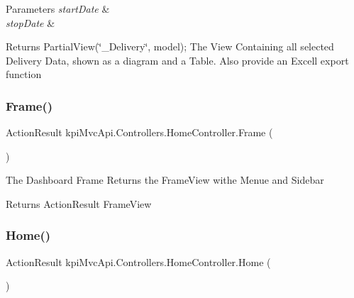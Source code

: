 \begin{DoxyParams}{Parameters}
{\em start\+Date} & \\
\hline
{\em stop\+Date} & \\
\hline
\end{DoxyParams}
\begin{DoxyReturn}{Returns}
{\ttfamily Partial\+View(\char`\"{}\+\_\+\+Delivery\char`\"{}, model);} The View Containing all selected Delivery Data, shown as a diagram and a Table. Also provide an Excell export function 
\end{DoxyReturn}
\mbox{\label{classkpi_mvc_api_1_1_controllers_1_1_home_controller_a8fe51f06ec9db44e1766f89691af44f6}} 
\subsubsection{\texorpdfstring{Frame()}{Frame()}}
{\footnotesize\ttfamily Action\+Result kpi\+Mvc\+Api.\+Controllers.\+Home\+Controller.\+Frame (\begin{DoxyParamCaption}{ }\end{DoxyParamCaption})\hspace{0.3cm}{\ttfamily [inline]}}



The Dashboard Frame Returns the Frame\+View withe Menue and Sidebar 

\begin{DoxyReturn}{Returns}
Action\+Result Frame\+View
\end{DoxyReturn}
\mbox{\label{classkpi_mvc_api_1_1_controllers_1_1_home_controller_a71cc0c383f8e44677455f0caf590e0a7}} 
\subsubsection{\texorpdfstring{Home()}{Home()}}
{\footnotesize\ttfamily Action\+Result kpi\+Mvc\+Api.\+Controllers.\+Home\+Controller.\+Home (\begin{DoxyParamCaption}{ }\end{DoxyParamCaption})\hspace{0.3cm}{\ttfamily [inline]}}



